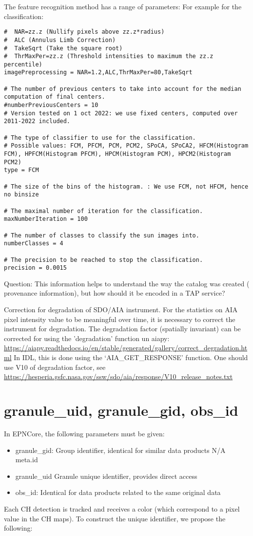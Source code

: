 \documentclass{article}
\begin{document}
The feature recognition method has a range of parameters:
For example for the classification:
\begin{verbatim}
#  NAR=zz.z (Nullify pixels above zz.z*radius)
#  ALC (Annulus Limb Correction)
#  TakeSqrt (Take the square root)
#  ThrMaxPer=zz.z (Threshold intensities to maximum the zz.z percentile)
imagePreprocessing = NAR=1.2,ALC,ThrMaxPer=80,TakeSqrt

# The number of previous centers to take into account for the median computation of final centers.
#numberPreviousCenters = 10
# Version tested on 1 oct 2022: we use fixed centers, computed over 2011-2022 included.

# The type of classifier to use for the classification.
# Possible values: FCM, PFCM, PCM, PCM2, SPoCA, SPoCA2, HFCM(Histogram FCM), HPFCM(Histogram PFCM), HPCM(Histogram PCM), HPCM2(Histogram PCM2)
type = FCM

# The size of the bins of the histogram. : We use FCM, not HFCM, hence no binsize

# The maximal number of iteration for the classification.
maxNumberIteration = 100

# The number of classes to classify the sun images into.
numberClasses = 4

# The precision to be reached to stop the classification.
precision = 0.0015
\end{verbatim}

Question: This information helps to understand the way the catalog was created ( provenance information), but how should it be encoded in a TAP service?

{Correction for degradation of SDO/AIA instrument}. For the statistics on AIA pixel intensity value to be meaningful over time, it is necessary to correct the instrument for degradation.
The degradation factor (spatially invariant) can be corrected for using the 'degradation' function un aiapy:
\url{https://aiapy.readthedocs.io/en/stable/generated/gallery/correct_degradation.html}
In IDL, this is done using the
\lq AIA\_GET\_RESPONSE' function.  One should use V10 of degradation factor, see \url{https://hesperia.gsfc.nasa.gov/ssw/sdo/aia/response/V10_release_notes.txt}


\section{granule\_uid, granule\_gid, obs\_id}
In EPNCore, the following parameters must be given:
\begin{itemize}
\item granule\_gid: Group identifier, identical for similar data products 	N/A 	meta.id
\item granule\_uid 		Granule unique identifier, provides direct access
\item obs\_id:  	Identical for data products related to the same original data
\end{itemize}
Each CH detection is tracked and receives a color (which correspond to a pixel value in the CH maps). To construct the unique identifier, we propose the following:
\end{document}
